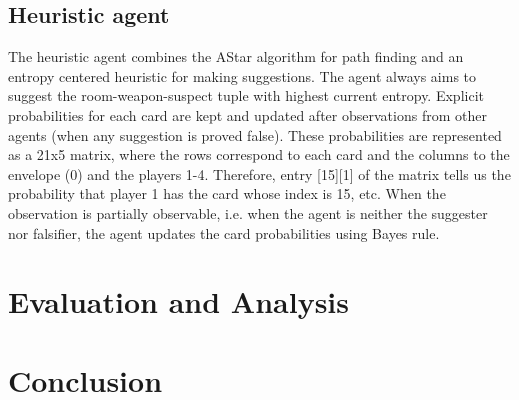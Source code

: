 \documentclass[msc, deptreport, ai, romanprepages]{infthesis}
\begin{document}
\section{Heuristic agent}
The heuristic agent combines the AStar algorithm for path finding and an entropy centered heuristic for making suggestions. The agent always aims to suggest the room-weapon-suspect tuple with highest current entropy. Explicit probabilities for each card are kept and updated after observations from other agents (when any suggestion is proved false). These probabilities are represented as a 21x5 matrix, where the rows correspond to each card and the columns to the envelope (0) and the players 1-4. Therefore, entry [15][1] of the matrix tells us the probability that player 1 has the card whose index is 15, etc. When the observation is partially observable, i.e. when the agent is neither the suggester nor falsifier, the agent updates the card probabilities using Bayes rule.

\chapter{Evaluation and Analysis}

\chapter{Conclusion}



\newpage
 
\nocite{*}

\end{document}

